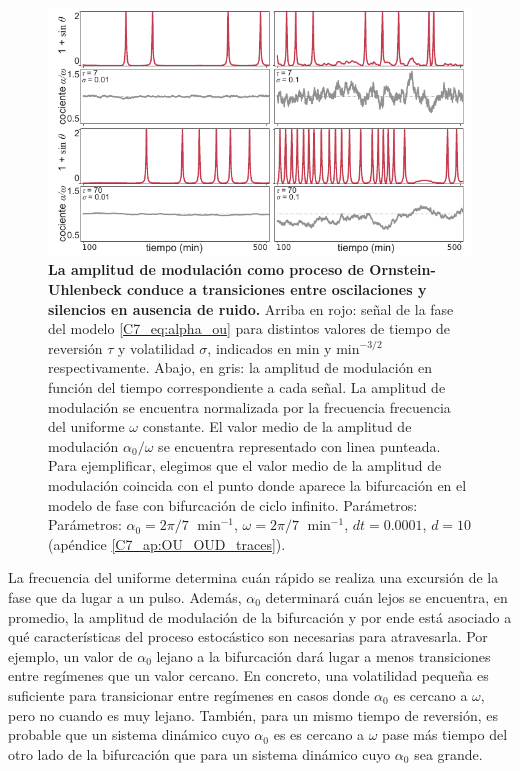 \documentclass[./main.tex]{subfiles}
\begin{document}
\begin{figure}
    \centering
    \includegraphics[width=1\columnwidth]{figures/chapter7/C7_OU_ex_traces.pdf} 
    \caption{\textbf{La amplitud de modulación como proceso de Ornstein-Uhlenbeck conduce a transiciones entre oscilaciones y silencios en ausencia de ruido.} Arriba en rojo: señal de la fase del modelo \ref{C7_eq:alpha_ou} para distintos valores de tiempo de reversión $\tau$ y volatilidad $\sigma$, indicados en min y $\text{min}^{-3/2}$ respectivamente. Abajo, en gris: la amplitud de modulación en función del tiempo correspondiente a cada señal. La amplitud de modulación se encuentra normalizada por la frecuencia frecuencia del uniforme $\omega$ constante. El valor medio de la amplitud de modulación $\alpha_0/\omega$ se encuentra representado con linea punteada. Para ejemplificar, elegimos que el valor medio de la amplitud de modulación coincida con el punto donde aparece la bifurcación en el modelo de fase con bifurcación de ciclo infinito. Parámetros:  Parámetros: $\alpha_0 = 2\pi/7 \;\text{ min}^{-1}$, $\omega = 2\pi/7 \;\text{ min}^{-1}$, $dt = 0.0001$, $d=10$ (apéndice \ref{C7_ap:OU_OUD_traces}).}
    \label{C7_fig:OU_TS}
\end{figure} 


La frecuencia del uniforme determina cuán rápido se realiza una excursión de la fase que da lugar a un pulso. Además, $\alpha_0$ determinará cuán lejos se encuentra, en promedio, la amplitud de modulación de la bifurcación y por ende está asociado a qué características del proceso estocástico son necesarias para atravesarla. Por ejemplo, un valor de $\alpha_0$ lejano a la bifurcación dará lugar a menos transiciones entre regímenes que un valor cercano. En concreto, una volatilidad pequeña es suficiente para transicionar entre regímenes en casos donde $\alpha_0$ es cercano a $\omega$, pero no cuando es muy lejano. También, para un mismo tiempo de reversión, es probable que un sistema dinámico cuyo $\alpha_0$ es es cercano a $\omega$ pase más tiempo del otro lado de la bifurcación que para un sistema dinámico cuyo $\alpha_0$ sea grande.
\end{document}
